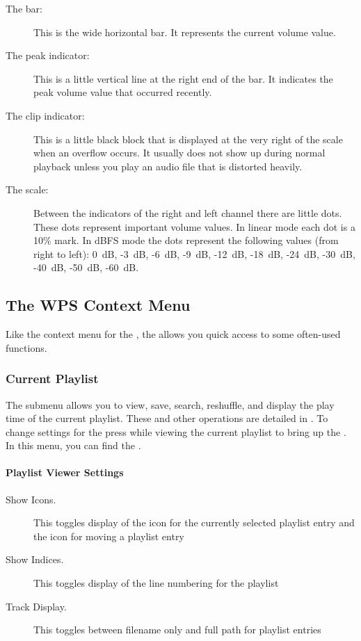 \begin{description}
\item [The bar:]
  This is the wide horizontal bar. It represents the current volume value.
\item [The peak indicator:]
  This is a little vertical line at the right end of the bar. It indicates
  the peak volume value that occurred recently.
\item [The clip indicator:]
  This is a little black block that is displayed at the very right of the
  scale when an overflow occurs. It usually does not show up during normal
  playback unless you play an audio file that is distorted heavily.
\item [The scale:]
  Between the indicators of the right and left channel there are little dots.
  These dots represent important volume values. In linear mode each dot is a
  10\% mark. In dBFS mode the dots represent the following values (from right
  to left): 0~dB, {}-3~dB, {}-6~dB, {}-9~dB, {}-12~dB, {}-18~dB, {}-24~dB, {}-30~dB,
  {}-40~dB, {}-50~dB, {}-60~dB.
\end{description}

\subsection{\label{sec:contextmenu}The WPS Context Menu}
Like the context menu for the , the 
allows you quick access to some often-used functions.

\subsubsection{Current Playlist}
The  submenu allows you to view, save, search, reshuffle,
and display the play time of the current playlist. These and other operations
are detailed in . To change settings for
the  press \ActionStdContext{} while viewing the
current playlist to bring up the . In this
menu, you can find the .

\paragraph{Playlist Viewer Settings}
  \begin{description}
    \item[Show Icons.] This toggles display of the icon for the currently
    selected playlist entry and the icon for moving a playlist entry
    \item[Show Indices.] This toggles display of the line numbering for
       the playlist
    \item[Track Display.] This toggles between filename only and full path
       for playlist entries
  \end{description}


